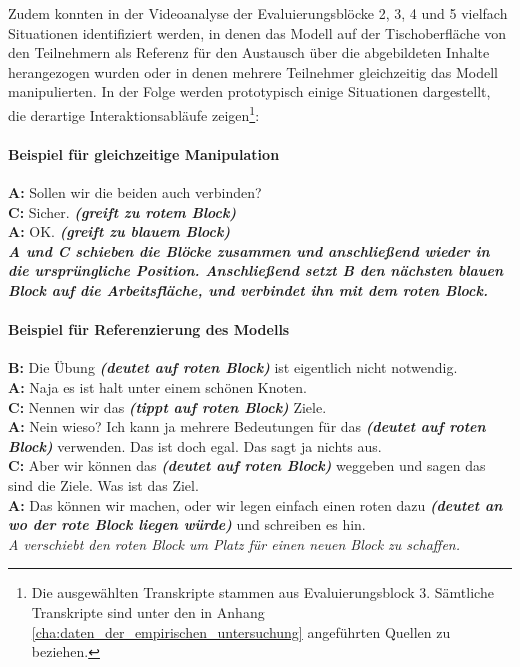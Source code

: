 Zudem konnten in der Videoanalyse der Evaluierungsblöcke 2, 3, 4 und 5 vielfach Situationen identifiziert werden, in denen das Modell auf der Tischoberfläche von den Teilnehmern als Referenz für den Austausch über die abgebildeten Inhalte herangezogen wurden oder in denen mehrere Teilnehmer gleichzeitig das Modell manipulierten. In der Folge werden prototypisch einige Situationen dargestellt, die derartige Interaktionsabläufe zeigen\footnote{Die ausgewählten Transkripte stammen aus Evaluierungsblock 3. Sämtliche Transkripte sind unter den in Anhang \ref{cha:daten_der_empirischen_untersuchung} angeführten Quellen zu beziehen.}:

\paragraph{Beispiel für gleichzeitige Manipulation} %
\begin{transkript}
	\textbf{A:} Sollen wir die beiden auch verbinden? \\
	\textbf{C:} Sicher. \emph{\textbf{(greift zu rotem Block)}} \\
	\textbf{A:} OK. \emph{\textbf{(greift zu blauem Block)}} \\
	\emph{\textbf{A und C schieben die Blöcke zusammen und anschließend wieder in die ursprüngliche Position. Anschließend setzt B den nächsten blauen Block auf die Arbeitsfläche, und verbindet ihn mit dem roten Block.}} \\
\end{transkript}

\paragraph{Beispiel für Referenzierung des Modells} %
\begin{transkript}
	\textbf{B:} Die Übung \emph{\textbf{(deutet auf roten Block)}} ist eigentlich nicht notwendig. \\
	\textbf{A:} Naja es ist halt unter einem schönen Knoten. \\
	\textbf{C:} Nennen wir das \emph{\textbf{(tippt auf roten Block)}} Ziele. \\
	\textbf{A:} Nein wieso? Ich kann ja mehrere Bedeutungen für das \emph{\textbf{(deutet auf roten Block)}} verwenden. Das ist doch egal. Das sagt ja nichts aus. \\
	\textbf{C:} Aber wir können das \emph{\textbf{(deutet auf roten Block)}} weggeben und sagen das sind die Ziele. Was ist das Ziel. \\
	\textbf{A:} Das können wir machen, oder wir legen einfach einen roten dazu \emph{\textbf{(deutet an wo der rote Block liegen würde)}} und schreiben es hin. \\
	\emph{A verschiebt den roten Block um Platz für einen neuen Block zu schaffen.} \\
\end{transkript}

